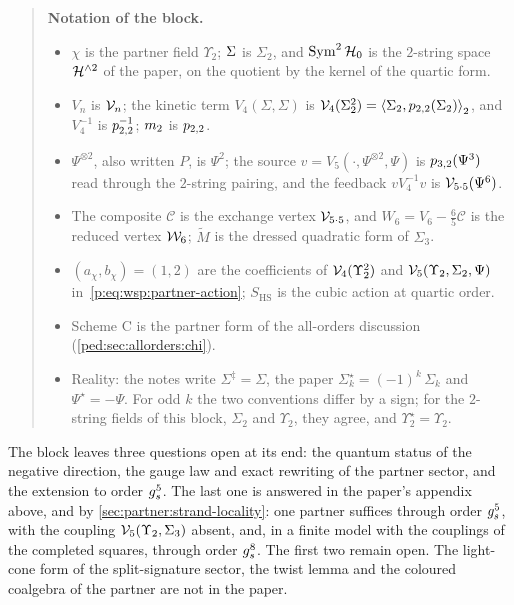 \begin{quote}
  \small
  \textbf{Notation of the block.}
  \begin{itemize}
    \item $\chi$ is the partner field $\Upsilon_2$; $\Sig$ is $\Sigma_2$, and $\Sym^2 \Hilb_0$ is the $2$-string space $\Hn{2}$ of the paper, on the quotient by the kernel of the quartic form.
    \item $V_n$ is $\vertex{n}$; the kinetic term $V_4(\Sigma, \Sigma)$ is $\vertex{4}(\Sigma_2^2) = \pair[2]{\Sigma_2}{\sprod{2}{2}(\Sigma_2)}$, and $V_4^{-1}$ is $\sprod{2}{2}^{-1}$; $\mtwo$ is $\sprod{2}{2}$.
    \item $\Psi^{\otimes 2}$, also written $P$, is $\Psi^2$; the source $v = V_5(\cdot, \Psi^{\otimes 2}, \Psi)$ is $\sprod{3}{2}(\Psi^3)$ read through the $2$-string pairing, and the feedback $v V_4^{-1} v$ is $\vertex{5 \cdot 5}(\Psi^6)$.
    \item The composite $\mathcal C$ is the exchange vertex $\vertex{5 \cdot 5}$, and $W_6 = V_6 - \frac{6}{5} \mathcal C$ is the reduced vertex $\dvertex{6}$; $\tilde M$ is the dressed quadratic form of $\Sigma_3$.
    \item $(a_\chi, b_\chi) = (1, 2)$ are the coefficients of $\vertex{4}(\Upsilon_2^2)$ and $\vertex{5}(\Upsilon_2, \Sigma_2, \Psi)$ in~\eqref{p:eq:wsp:partner-action}; $S_{\mathrm{HS}}$ is the cubic action at quartic order.
    \item Scheme C is the partner form of the all-orders discussion (\cref{ped:sec:allorders:chi}).
    \item Reality: the notes write $\Sigma^\ddagger = \Sigma$, the paper $\Sigma_k^\star = (-1)^k \, \Sigma_k$ and $\Psi^\star = - \Psi$. For odd $k$ the two conventions differ by a sign; for the $2$-string fields of this block, $\Sigma_2$ and $\Upsilon_2$, they agree, and $\Upsilon_2^\star = \Upsilon_2$.
  \end{itemize}
\end{quote}

The block leaves three questions open at its end: the quantum status of the negative direction, the gauge law and exact rewriting of the partner sector, and the extension to order $\gs^5$.
The last one is answered in the paper's appendix above, and by \cref{sec:partner:strand-locality}: one partner suffices through order $\gs^5$, with the coupling $\vertex{5}(\Upsilon_2, \Sigma_3)$ absent, and, in a finite model with the couplings of the completed squares, through order $\gs^8$.
The first two remain open.
The light-cone form of the split-signature sector, the twist lemma and the coloured coalgebra of the partner are not in the paper.


